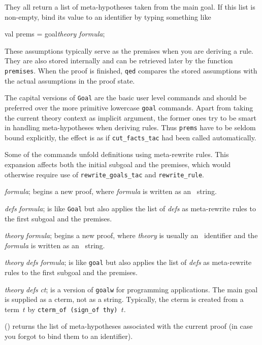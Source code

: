 They all return a list of meta-hypotheses taken from the main goal.  If
this list is non-empty, bind its value to an \ML{} identifier by typing
something like
\begin{ttbox} 
val prems = goal{\it theory\/ formula};
\end{ttbox}
These assumptions typically serve as the premises when you are
deriving a rule.  They are also stored internally and can be retrieved
later by the function \texttt{premises}.  When the proof is finished,
\texttt{qed} compares the stored assumptions with the actual
assumptions in the proof state.

The capital versions of \texttt{Goal} are the basic user level
commands and should be preferred over the more primitive lowercase
\texttt{goal} commands.  Apart from taking the current theory context
as implicit argument, the former ones try to be smart in handling
meta-hypotheses when deriving rules.  Thus \texttt{prems} have to be
seldom bound explicitly, the effect is as if \texttt{cut_facts_tac}
had been called automatically.

Some of the commands unfold definitions using meta-rewrite rules.  This
expansion affects both the initial subgoal and the premises, which would
otherwise require use of \texttt{rewrite_goals_tac} and
\texttt{rewrite_rule}.

\begin{ttdescription}
\item[\ttindexbold{Goal} {\it formula};] begins a new proof, where
  {\it formula\/} is written as an \ML\ string.
  
\item[\ttindexbold{Goalw} {\it defs} {\it formula};] is like
  \texttt{Goal} but also applies the list of {\it defs\/} as
  meta-rewrite rules to the first subgoal and the premises.

\item[\ttindexbold{goal} {\it theory} {\it formula};] 
begins a new proof, where {\it theory} is usually an \ML\ identifier
and the {\it formula\/} is written as an \ML\ string.

\item[\ttindexbold{goalw} {\it theory} {\it defs} {\it formula};] 
is like \texttt{goal} but also applies the list of {\it defs\/} as
meta-rewrite rules to the first subgoal and the premises.

\item[\ttindexbold{goalw_cterm} {\it theory} {\it defs} {\it ct};] is
  a version of \texttt{goalw} for programming applications.  The main
  goal is supplied as a cterm, not as a string.  Typically, the cterm
  is created from a term~$t$ by \texttt{cterm_of (sign_of thy) $t$}.

\item[\ttindexbold{premises}()] 
returns the list of meta-hypotheses associated with the current proof (in
case you forgot to bind them to an \ML{} identifier).
\end{ttdescription}



